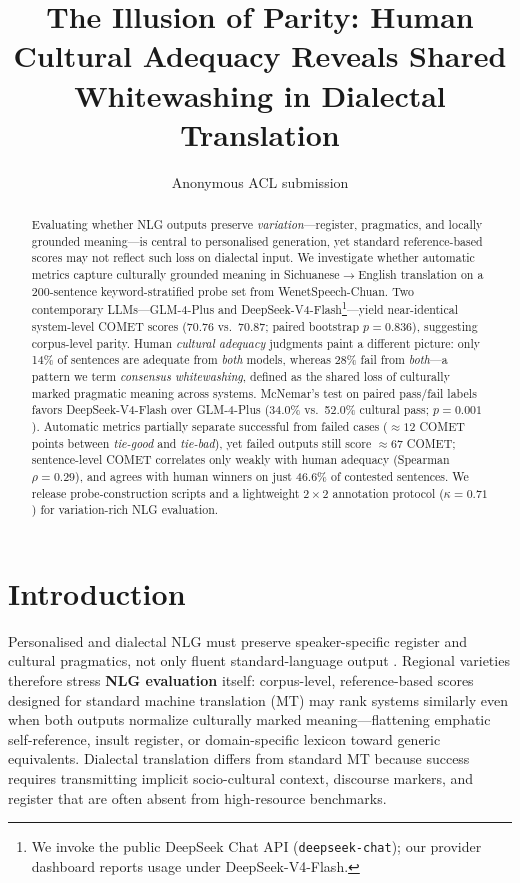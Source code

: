 \documentclass[11pt]{article}
\title{The Illusion of Parity: Human Cultural Adequacy Reveals Shared Whitewashing in Dialectal Translation}
\author{Anonymous ACL submission}
\begin{document}
\maketitle

\begin{abstract}
Evaluating whether NLG outputs preserve \emph{variation}---register, pragmatics, and locally grounded meaning---is central to personalised generation, yet standard reference-based scores may not reflect such loss on dialectal input.
We investigate whether automatic metrics capture culturally grounded meaning in Sichuanese$\rightarrow$English translation on a 200-sentence keyword-stratified probe set from WenetSpeech-Chuan.
Two contemporary LLMs---GLM-4-Plus and DeepSeek-V4-Flash\footnote{We invoke the public DeepSeek Chat API (\texttt{deepseek-chat}); our provider dashboard reports usage under DeepSeek-V4-Flash.}---yield near-identical system-level COMET scores (70.76 vs.\ 70.87; paired bootstrap $p=0.836$), suggesting corpus-level parity.
Human \emph{cultural adequacy} judgments paint a different picture: only 14\% of sentences are adequate from \emph{both} models, whereas 28\% fail from \emph{both}---a pattern we term \emph{consensus whitewashing}, defined as the shared loss of culturally marked pragmatic meaning across systems.
McNemar's test on paired pass/fail labels favors DeepSeek-V4-Flash over GLM-4-Plus (34.0\% vs.\ 52.0\% cultural pass; $p=0.001$).
Automatic metrics partially separate successful from failed cases (${\approx}12$ COMET points between \emph{tie-good} and \emph{tie-bad}), yet failed outputs still score ${\approx}67$ COMET; sentence-level COMET correlates only weakly with human adequacy (Spearman $\rho=0.29$), and agrees with human winners on just 46.6\% of contested sentences.
We release probe-construction scripts and a lightweight $2{\times}2$ annotation protocol ($\kappa=0.71$) for variation-rich NLG evaluation.
\end{abstract}

\section{Introduction}

Personalised and dialectal NLG must preserve speaker-specific register and cultural pragmatics, not only fluent standard-language output \cite{hendy-etal-2023-mt}.
Regional varieties therefore stress \textbf{NLG evaluation} itself: corpus-level, reference-based scores designed for standard machine translation (MT) may rank systems similarly even when both outputs normalize culturally marked meaning---flattening emphatic self-reference, insult register, or domain-specific lexicon toward generic equivalents.
Dialectal translation differs from standard MT because success requires transmitting implicit socio-cultural context, discourse markers, and register that are often absent from high-resource benchmarks.
\end{document}

